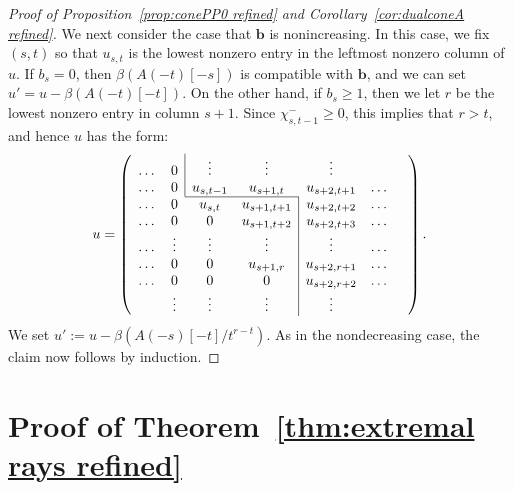 \documentclass[12pt]{amsart}
\theoremstyle{definition}
\theoremstyle{remark}
\newcommand{\bb}{\mathbf{b}}
\begin{document}
\begin{proof}[Proof of Proposition~\ref{prop:conePP0 refined} and Corollary~\ref{cor:dualconeA refined}]
We next consider the case that $\bb$ is nonincreasing.  In this case,  we fix $(s,t)$ so that $u_{s,t}$ is the lowest nonzero entry in the leftmost nonzero column of $u$.  If $b_s=0$, then $\beta(A(-t)[-s])$ is compatible with $\bb$, and we can set $u'=u-\beta(A(-t)[-t])$.  On the other hand, if $b_s\geq 1$, then we let $r$ be the lowest nonzero entry in column $s+1$.  Since $\chi^{-}_{s,t-1}\geq 0$, this implies that $r>t$, and hence $u$ has the form:
\[
u=
\left(
\begin{array}{ccccccc}
\dots&0&\multicolumn{1}{|c}{\vdots}&\vdots&\vdots&\\
\dots&0&\multicolumn{1}{|c}{u_{s,t-1}}&u_{s+1,t}&u_{s+2,t+1}&\dots\\ \cline{3-4}
\dots&0&{u_{s,t}}&u_{s+1,t+1}&\multicolumn{1}{|c}{u_{s+2,t+2}}&\dots\\ 
\dots&0&0&u_{s+1,t+2}&\multicolumn{1}{|c}{u_{s+2,t+3}}&\dots\\
\dots&\vdots &\vdots &\vdots &\multicolumn{1}{|c}{\vdots}&\dots\\
\dots&0&0&u_{s+1,r}&\multicolumn{1}{|c}{u_{s+2,r+1}}&\dots\\
\dots&0&0&0&\multicolumn{1}{|c}{u_{s+2,r+2}}&\dots\\
&\vdots& \vdots&\vdots&\multicolumn{1}{|c}{\vdots}&&\\
\end{array}\right).
\]
We set $u':=u-\beta(A(-s)[-t]/t^{r-t})$.  As in the nondecreasing case, the claim now follows by induction.
\end{proof}





\section{Proof of Theorem~\ref{thm:extremal rays refined}}\label{sec:refined proof}\label{sec:general case}
\end{document}

